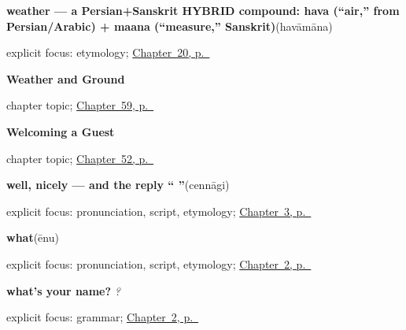 \noindent\begin{minipage}[t]{\linewidth}
\raggedright
\textbf{weather — a Persian+Sanskrit HYBRID compound: hava (\textquotedblleft{}air,\textquotedblright{} from Persian/Arabic) + maana (\textquotedblleft{}measure,\textquotedblright{} Sanskrit)}\enspace\emph{}\enspace(havāmāna)\par
\footnotesize explicit focus: etymology; \hyperref[ch:ka-numbers-and-weather]{Chapter~20, p.~\pageref*{ch:ka-numbers-and-weather}}
\end{minipage}\par\smallskip

\noindent\begin{minipage}[t]{\linewidth}
\raggedright
\textbf{Weather and Ground}\par
\footnotesize chapter topic; \hyperref[ch:ka-weather-ground]{Chapter~59, p.~\pageref*{ch:ka-weather-ground}}
\end{minipage}\par\smallskip

\noindent\begin{minipage}[t]{\linewidth}
\raggedright
\textbf{Welcoming a Guest}\par
\footnotesize chapter topic; \hyperref[ch:ka-welcome]{Chapter~52, p.~\pageref*{ch:ka-welcome}}
\end{minipage}\par\smallskip

\noindent\begin{minipage}[t]{\linewidth}
\raggedright
\textbf{well, nicely — and the reply \textquotedblleft{} \textquotedblright{}}\enspace\emph{}\enspace(cennāgi)\par
\footnotesize explicit focus: pronunciation, script, etymology; \hyperref[ch:responding]{Chapter~3, p.~\pageref*{ch:responding}}
\end{minipage}\par\smallskip

\noindent\begin{minipage}[t]{\linewidth}
\raggedright
\textbf{what}\enspace\emph{}\enspace(ēnu)\par
\footnotesize explicit focus: pronunciation, script, etymology; \hyperref[ch:introductions]{Chapter~2, p.~\pageref*{ch:introductions}}
\end{minipage}\par\smallskip

\noindent\begin{minipage}[t]{\linewidth}
\raggedright
\textbf{what's your name?}\enspace\emph{  ?}\par
\footnotesize explicit focus: grammar; \hyperref[ch:introductions]{Chapter~2, p.~\pageref*{ch:introductions}}
\end{minipage}\par\smallskip

